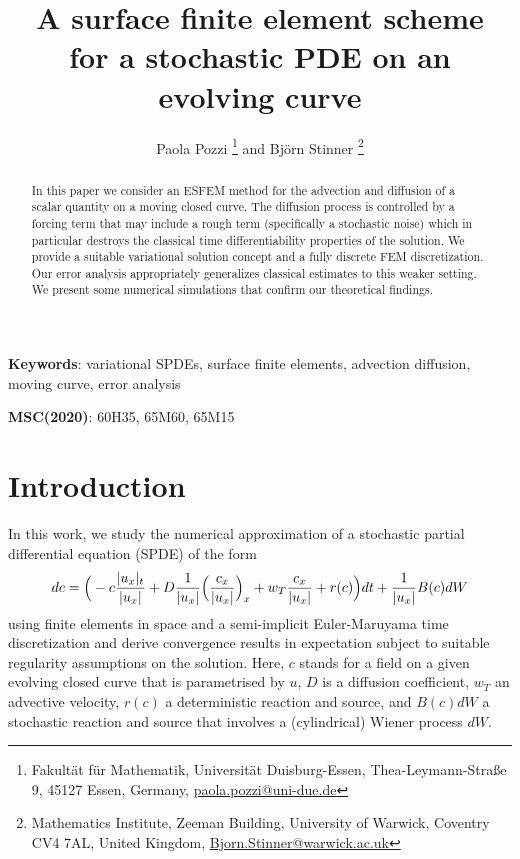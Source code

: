 \documentclass[a4paper,10pt]{article}
\title{A surface finite element scheme \\
for a stochastic PDE on an evolving curve}
\author{Paola Pozzi \thanks{Fakult\"at f\"ur Mathematik, Universit\"at Duisburg-Essen,
Thea-Leymann-Stra\ss e 9,
45127 Essen, Germany, \url{paola.pozzi@uni-due.de}} 
and Bj\"orn Stinner \thanks{Mathematics Institute,
Zeeman Building, 
University of Warwick,
Coventry CV4 7AL, 
United Kingdom, \url{Bjorn.Stinner@warwick.ac.uk}}
}
\numberwithin{equation}{section}
\begin{document}
\maketitle

\begin{abstract}
 In this paper we consider an ESFEM method for the advection and diffusion of a scalar quantity on a moving closed curve.
 The diffusion process is controlled by a forcing term that may include a rough term (specifically a stochastic noise) which in particular destroys the classical time differentiability properties of the solution. We provide a suitable variational solution concept and a fully discrete FEM discretization. Our  error analysis  appropriately generalizes classical estimates to this weaker setting. We present some numerical simulations that confirm our theoretical findings.
\end{abstract}

\bigskip
\noindent \textbf{Keywords}: variational SPDEs, surface finite elements, advection diffusion, moving curve, error analysis 
\bigskip
 
\noindent \textbf{MSC(2020)}: 60H35, 65M60, 65M15




\section{Introduction}

In this work, we study the numerical approximation of a stochastic partial differential equation (SPDE) of the form
\begin{equation} \label{eq:modeleq}
 dc = \Big{(} -c \frac{|u_x|_t}{|u_x|} + D\frac{1}{|u_x|} \Big{(} \frac{c_x}{|u_x|} \Big{)}_x + w_{T} \frac{c_x}{|u_x|} + r(c) \Big{)} dt + \frac{1}{|u_{x}|} B(c) dW
\end{equation}
using finite elements in space and a semi-implicit Euler-Maruyama time discretization and derive convergence results in expectation subject to suitable regularity assumptions on the solution. Here, $c$ stands for a field on a given evolving closed curve that is parametrised by $u$, $D$ is a diffusion coefficient, $w_{T}$ an advective velocity, $r(c)$ a deterministic reaction and source, and $B(c) dW$ a stochastic reaction and source that involves a (cylindrical) Wiener process $dW$.
\end{document}
